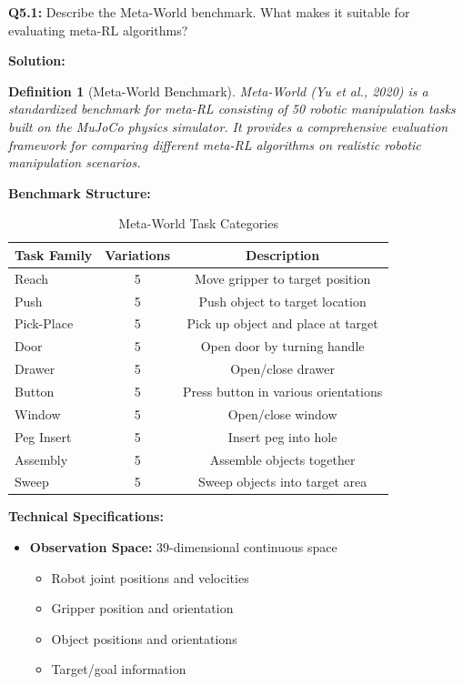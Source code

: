 \documentclass[12pt]{article}
\newcommand{\ieee}[1]{\textcolor{IEEEBlue}{\textbf{#1}}}
\newtheorem{definition}{Definition}
\begin{document}
{{			\textbf{Q5.1:} Describe the Meta-World benchmark. What makes it suitable for evaluating meta-RL algorithms?
			
			\textbf{Solution:}
			
			\begin{definition}[Meta-World Benchmark]
			Meta-World (Yu et al., 2020) is a standardized benchmark for meta-RL consisting of 50 robotic manipulation tasks built on the MuJoCo physics simulator. It provides a comprehensive evaluation framework for comparing different meta-RL algorithms on realistic robotic manipulation scenarios.
			\end{definition}
			
			\ieee{Benchmark Structure:}
			
			\begin{table}[H]
			\centering
			\caption{Meta-World Task Categories}
			\begin{tabular}{@{}lcc@{}}
			\toprule
			\textbf{Task Family} & \textbf{Variations} & \textbf{Description} \\
			\midrule
			Reach & 5 & Move gripper to target position \\
			Push & 5 & Push object to target location \\
			Pick-Place & 5 & Pick up object and place at target \\
			Door & 5 & Open door by turning handle \\
			Drawer & 5 & Open/close drawer \\
			Button & 5 & Press button in various orientations \\
			Window & 5 & Open/close window \\
			Peg Insert & 5 & Insert peg into hole \\
			Assembly & 5 & Assemble objects together \\
			Sweep & 5 & Sweep objects into target area \\
			\bottomrule
			\end{tabular}
			\label{tab:metaworld_tasks}
			\end{table}
			
			\ieee{Technical Specifications:}
			
			\begin{itemize}
				\item \textbf{Observation Space:} 39-dimensional continuous space
				\begin{itemize}
					\item Robot joint positions and velocities
					\item Gripper position and orientation
					\item Object positions and orientations
					\item Target/goal information
				\end{itemize}
				

\end{itemize}}}
\end{document}
